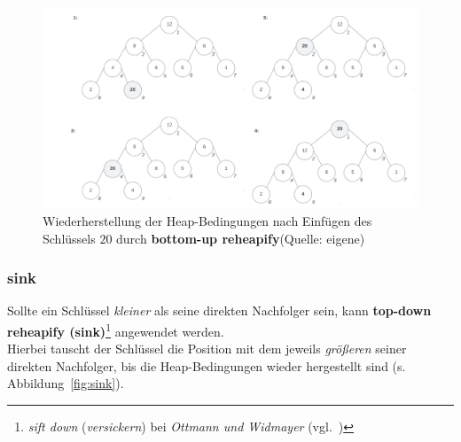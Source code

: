 \begin{figure}
    \begin{center}
        \includegraphics[scale=0.25]{chapters/Datenstrukturen und Algorithmen/img/swim}
        \caption{Wiederherstellung der Heap-Bedingungen nach Einfügen des Schlüssels $20$ durch \textbf{bottom-up reheapify}(Quelle: eigene)}
        \label{fig:swim}
    \end{center}
\end{figure}

\subsubsection{sink}
Sollte ein Schlüssel \textit{kleiner} als seine direkten Nachfolger sein, kann \textbf{top-down reheapify (sink)}\footnote{\textit{sift down} (\textit{versickern}) bei \textit{Ottmann und Widmayer} (vgl.~\cite[107 f.]{OW17b})} angewendet werden.\\

\noindent
Hierbei tauscht der Schlüssel die Position mit dem jeweils \textit{größeren} seiner direkten Nachfolger, bis die Heap-Bedingungen wieder hergestellt sind (s. Abbildung~\ref{fig:sink}).\\


